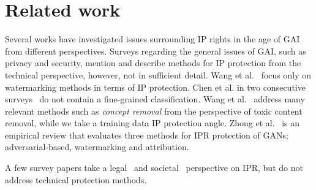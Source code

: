 \documentclass[conference]{IEEEtran}
\begin{document}
\section{Related work}\label{sec:related-work}
Several works have investigated issues surrounding IP rights in the age of GAI from different perspectives.
Surveys regarding the general issues of GAI, such as privacy and security, mention and describe methods for IP protection from the technical perspective, however, not in sufficient detail. Wang et al.~\cite{wang_survey_2023} focus only on watermarking methods in terms of IP protection. Chen et al. in two consecutive surveys~\cite{chen_pathway_2023,chen_challenges_2023} do not contain a fine-grained classification.
Wang et al.~\cite{wang_security_2023} address many relevant methods such as \textit{concept removal} from the perspective of toxic content removal, while we take a training data IP protection angle.
Zhong et al.~\cite{zhong_copyright_2023} is an empirical review that evaluates three methods for IPR protection of GANs; adversarial-based, watermarking and attribution. 

A few survey papers take a legal~\cite{smits_generative_2022,chesterman_good_2023} and societal~\cite{hristov_artificial_2020} perspective on IPR, but do not address technical protection methods. 

\end{document}
